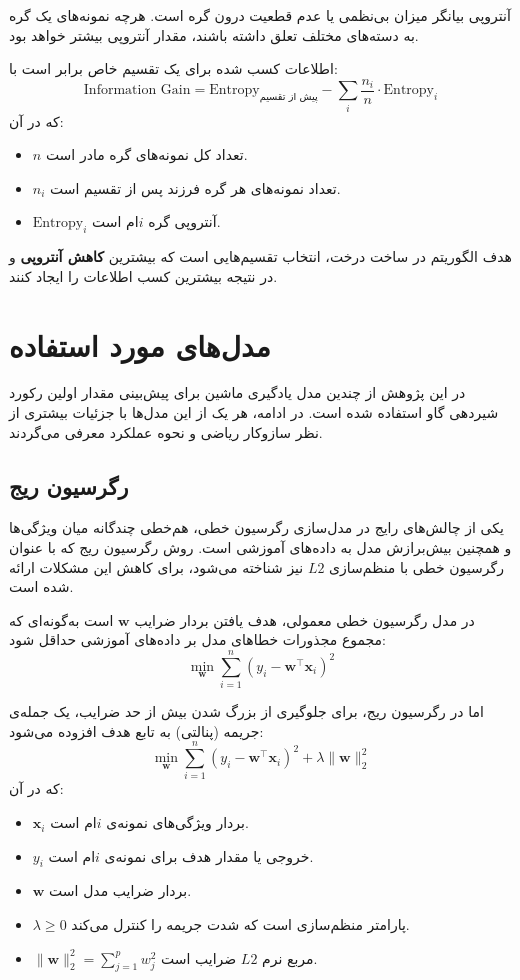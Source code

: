 آنتروپی بیانگر میزان بی‌نظمی یا عدم قطعیت درون گره است. هرچه نمونه‌های یک گره به دسته‌های مختلف تعلق داشته باشند، مقدار آنتروپی بیشتر خواهد بود.

اطلاعات کسب شده برای یک تقسیم خاص برابر است با:
\[
\text{Information Gain} = \text{Entropy}_{\text{پیش از تقسیم}} - \sum_{i} \frac{n_i}{n} \cdot \text{Entropy}_i
\]
که در آن:
\begin{itemize}
	\item $n$ تعداد کل نمونه‌های گره مادر است.
	\item $n_i$ تعداد نمونه‌های هر گره فرزند پس از تقسیم است.
	\item $\text{Entropy}_i$ آنتروپی گره $i$ام است.
\end{itemize}

هدف الگوریتم در ساخت درخت، انتخاب تقسیم‌هایی است که بیشترین \textbf{کاهش آنتروپی} و در نتیجه بیشترین کسب اطلاعات را ایجاد کنند.


\section{مدل‌های مورد استفاده}

در این پژوهش از چندین مدل یادگیری ماشین برای پیش‌بینی مقدار اولین رکورد شیردهی گاو استفاده شده است. در ادامه، هر یک از این مدل‌ها با جزئیات بیشتری از نظر سازوکار ریاضی و نحوه عملکرد معرفی می‌گردند.

\subsection[رگرسیون ریج]{رگرسیون ریج}

یکی از چالش‌های رایج در مدل‌سازی رگرسیون خطی، هم‌خطی چندگانه میان ویژگی‌ها و همچنین بیش‌برازش مدل به داده‌های آموزشی است. روش رگرسیون ریج که با عنوان رگرسیون خطی با منظم‌سازی \(L2\)  نیز شناخته می‌شود، برای کاهش این مشکلات ارائه شده است.

در مدل رگرسیون خطی معمولی، هدف یافتن بردار ضرایب $\boldsymbol{w}$ است به‌گونه‌ای که مجموع مجذورات خطاهای مدل بر داده‌های آموزشی حداقل شود:
\[
\min_{\boldsymbol{w}} \sum_{i=1}^{n} \left( y_i - \boldsymbol{w}^\top \boldsymbol{x}_i \right)^2
\]

اما در رگرسیون ریج، برای جلوگیری از بزرگ شدن بیش از حد ضرایب، یک جمله‌ی جریمه (پنالتی) به تابع هدف افزوده می‌شود:
\[
\min_{\boldsymbol{w}} \sum_{i=1}^{n} \left( y_i - \boldsymbol{w}^\top \boldsymbol{x}_i \right)^2 + \lambda \| \boldsymbol{w} \|_2^2
\]
که در آن:
\begin{itemize}
	\item $\boldsymbol{x}_i$ بردار ویژگی‌های نمونه‌ی $i$ام است.
	\item $y_i$ خروجی یا مقدار هدف برای نمونه‌ی $i$ام است.
	\item $\boldsymbol{w}$ بردار ضرایب مدل است.
	\item $\lambda \geq 0$ پارامتر منظم‌سازی است که شدت جریمه را کنترل می‌کند.
	\item $\| \boldsymbol{w} \|_2^2 = \sum_{j=1}^{p} w_j^2$ مربع نرم \(L2\)  ضرایب است.
\end{itemize}

